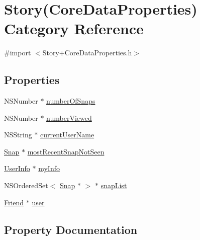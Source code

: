 \hypertarget{category_story_07_core_data_properties_08}{}\section{Story(Core\+Data\+Properties) Category Reference}
\label{category_story_07_core_data_properties_08}


{\ttfamily \#import $<$Story+\+Core\+Data\+Properties.\+h$>$}

\subsection*{Properties}
\begin{DoxyCompactItemize}
\item 
N\+S\+Number $\ast$ \hyperlink{category_story_07_core_data_properties_08_a274932e7cc41214730b2b9bd11b31de2}{number\+Of\+Snaps}
\item 
N\+S\+Number $\ast$ \hyperlink{category_story_07_core_data_properties_08_a5810378b61cd9f5b2b951440c8ca2db5}{number\+Viewed}
\item 
N\+S\+String $\ast$ \hyperlink{category_story_07_core_data_properties_08_a1d58b14f07e9d3fbab4a4703a066bfc2}{current\+User\+Name}
\item 
\hyperlink{interface_snap}{Snap} $\ast$ \hyperlink{category_story_07_core_data_properties_08_a3034a750fc40fc2b0985d5a7f5213909}{most\+Recent\+Snap\+Not\+Seen}
\item 
\hyperlink{interface_user_info}{User\+Info} $\ast$ \hyperlink{category_story_07_core_data_properties_08_a5f52fcbdeb0aabdd93d2a4312bb9759e}{my\+Info}
\item 
N\+S\+Ordered\+Set$<$ \hyperlink{interface_snap}{Snap} $\ast$ $>$ $\ast$ \hyperlink{category_story_07_core_data_properties_08_a4616dbf24fe3c6c6f5482aea92cedd57}{snap\+List}
\item 
\hyperlink{interface_friend}{Friend} $\ast$ \hyperlink{category_story_07_core_data_properties_08_a121feaf5c67f45ee0541af06a20407af}{user}
\end{DoxyCompactItemize}


\subsection{Property Documentation}
\hypertarget{category_story_07_core_data_properties_08_a1d58b14f07e9d3fbab4a4703a066bfc2}{}\label{category_story_07_core_data_properties_08_a1d58b14f07e9d3fbab4a4703a066bfc2} 

